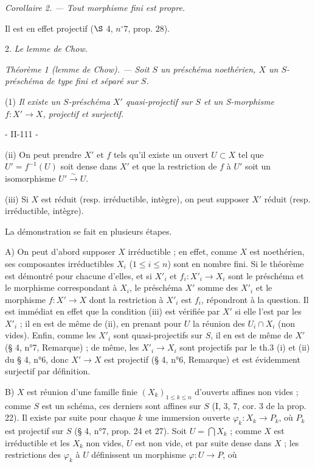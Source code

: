 \emph{Corollaire 2. — Tout morphisme fini est propre.}

Il est en effet projectif ($\S$ 4, $n^{\circ}7$, prop. 28).

2. \emph{Le lemme de Chow.}

\emph{Théorème 1 (lemme de Chow). — Soit $S$ un préschéma noethérien, $X$ un $S$-préschéma de type fini et séparé sur $S$.}

(1) \emph{Il existe un $S$-préschéma $X'$ quasi-projectif sur $S$ et un S-morphisme $f : X' \to X$, projectif et surjectif.}

\newpage


- II-111 -

(ii) On peut prendre $X'$ et $f$ tels qu'il existe un ouvert $U \subset X$ tel que $U' = f^{-1}(U)$ soit dense dans $X'$ et que la restriction de $f$ à $U'$ soit un isomorphisme $U' \xrightarrow{\sim} U$.

(iii) Si $X$ est réduit (resp. irréductible, intègre), on peut supposer $X'$ réduit (resp. irréductible, intègre).

La démonstration se fait en plusieurs étapes.

A) On peut d'abord supposer $X$ irréductible ; en effet, comme $X$ est noethérien, ses composantes irréductibles $X_i$ ($1 \leq i \leq n$) sont en nombre fini. Si le théorème est démontré pour chacune d'elles, et si $X'_i$ et $f_i : X'_i \to X_i$ sont le préschéma et le morphisme correspondant à $X_i$, le préschéma $X'$ somme des $X'_i$ et le morphisme $f : X' \to X$ dont la restriction à $X'_i$ est $f_i$, répondront à la question. Il est immédiat en effet que la condition (iii) est vérifiée par $X'$ si elle l'est par les $X'_i$ ; il en est de même de (ii), en prenant pour $U$ la réunion des $U_i \cap X_i$ (non vides). Enfin, comme les $X'_i$ sont quasi-projectifs sur $S$, il en est de même de $X'$ (§ 4, n°7, Remarque) ; de même, les $X'_i \to X_i$ sont projectifs par le th.3 (i) et (ii) du § 4, n°6, donc $X' \to X$ est projectif (§ 4, n°6, Remarque) et est évidemment surjectif par définition.

B) $X$ est réunion d'une famille finie $(X_k)_{1 \leq k \leq n}$ d'ouverts affines non vides ; comme $S$ est un schéma, ces derniers sont affines sur $S$ (I, 3, 7, cor. 3 de la prop. 22). Il existe par suite pour chaque $k$ une immersion ouverte $\varphi_k : X_k \to P_k$, où $P_k$ est projectif sur $S$ (§ 4, n°7, prop. 24 et 27). Soit $U = \bigcap X_k$ ; comme $X$ est irréductible et les $X_k$ non vides, $U$ est non vide, et par suite dense dans $X$ ; les restrictions des $\varphi_k$ à $U$ définissent un morphisme $\varphi : U \to P$, où

